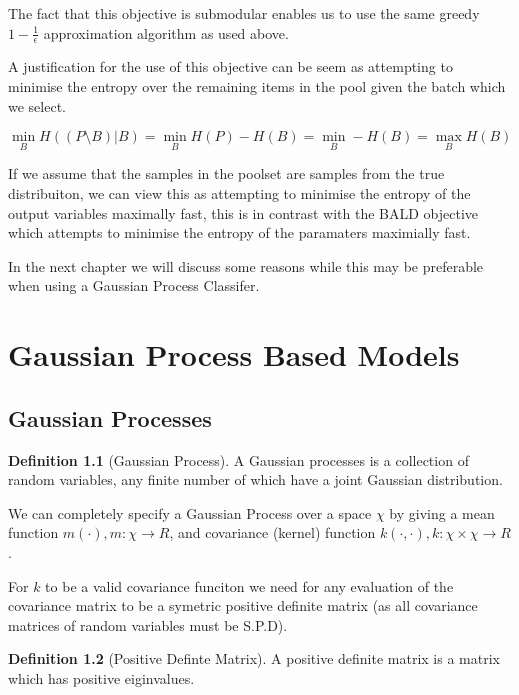 \documentclass[12pt, a4paper]{report}
\theoremstyle{definition}
\newtheorem{definition}{Definition}[section]
\begin{document}
The fact that this objective is submodular enables us to use the same greedy $1 - \frac{1}{\epsilon}$ approximation algorithm as used above.

A justification for the use of this objective can be seem as attempting to minimise the entropy over the remaining items in the pool given the batch which we select.


$$\min_{B} H( \left(P \setminus B\right) | B) = \min_{B} H(P) - H(B) = \min_{B} - H(B) = \max_B H(B)$$

If we assume that the samples in the poolset are samples from the true distribuiton, we can view this as attempting to minimise the entropy of the output variables maximally fast, this is in contrast with the BALD objective which attempts to minimise the entropy of the paramaters maximially fast.

In the next chapter we will discuss some reasons while this may be preferable when using a Gaussian Process Classifer.

\chapter{Gaussian Process Based Models}
\label{Chap4}


\section{Gaussian Processes}


\begin{definition}[Gaussian Process]
    A Gaussian processes is a collection of random variables, any finite number of which have a joint Gaussian distribution. \cite[]{rasmussen2003gaussian}
\end{definition}


We can completely specify a Gaussian Process over a space $\chi$ by giving a mean function $m(\cdot), m : \chi \rightarrow R$, and covariance (kernel) function $k(\cdot, \cdot), k: \chi \times \chi \rightarrow R$.


For $k$ to be a valid covariance funciton we need for any evaluation of the covariance matrix to be a symetric positive definite matrix (as all covariance matrices of random variables must be S.P.D).

\begin{definition}[Positive Definte Matrix]
    A positive definite matrix is a matrix which has positive eiginvalues.
\end{definition}
\end{document}
